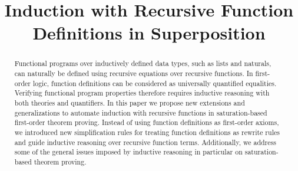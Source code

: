 \documentclass[conference]{IEEEtran}
\theoremstyle{definition}
\begin{document}
	\title{Induction with Recursive Function Definitions in Superposition}


	\author{
	}

	\maketitle

	\begin{abstract}
Functional programs over inductively defined data types, such as lists and naturals,
can naturally be defined using recursive equations over recursive functions.
In first-order logic,  function
definitions can be considered as universally quantified equalities.
Verifying functional program properties therefore
 requires inductive
reasoning with both theories and quantifiers.
In this paper we propose new  extensions and
generalizations to automate induction with recursive functions in saturation-based first-order theorem proving.
Instead of using function definitions as first-order axioms, we introduced new simplification rules for
treating function definitions as rewrite rules and guide inductive reasoning over recursive function terms. Additionally, we address some of the general issues imposed by inductive reasoning in particular on saturation-based theorem proving.
	\end{abstract}





	\IEEEpeerreviewmaketitle
\end{document}
